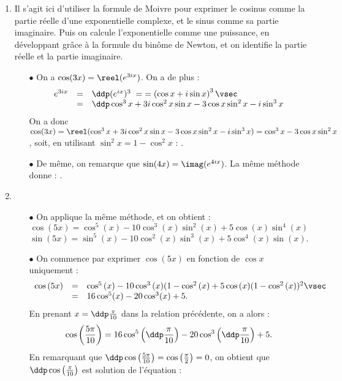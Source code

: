 \begin{correction}   \;
\begin{enumerate}
\item Il s'agit ici d'utiliser la formule de Moivre pour exprimer le cosinus comme la partie r\'eelle d'une exponentielle complexe, et le sinus comme sa partie imaginaire. Puis on calcule l'exponentielle comme une puissance, en d\'eveloppant gr\^ace \`a la formule du bin\^ome de Newton, et on identifie la partie r\'eelle et la partie imaginaire.
\begin{itemize}
\item[$\bullet$] On a $\cos (3x) = \reel(e^{3ix})$. On a de plus :
$$\begin{array}{rcl}
e^{3ix} & = & \ddp (e^{ix})^3 \; = \; = \left(\cos x + i \sin x \right)^3\vsec\\
& = & \ddp \cos^3 x + 3 i \cos^2 x \sin x - 3 \cos x \sin^2 x - i \sin^3 x
\end{array}$$
On a donc $\cos (3x) = \reel (\cos^3 x + 3 i \cos^2 x \sin x - 3 \cos x \sin^2 x - i \sin^3 x) = \cos^3{x}-3\cos{x}\sin^2{x}$, soit, en utilisant $\sin^2 x =1-\cos^2 x$ : . 
\item[$\bullet$] De m\^eme, on remarque que $\sin(4x) = \imag(e^{4ix})$. La m\^eme m\'ethode donne : .
\end{itemize}
\item 
\begin{itemize}
\item[$\bullet$]  On applique la m\^eme m\'ethode, et on obtient :
$$\cos{(5x)} = \cos^5{(x)}-10\cos^3{(x)}\sin^2{(x)}+5\cos{(x)}\sin^4{(x)}$$
$$\sin{(5x)}= \sin^5{(x)} -10\cos^2{(x)}\sin^3{(x)}+5\cos^4{(x)}\sin{(x)}  .$$
\item[$\bullet$] On commence par exprimer $\cos{(5x)}$ en fonction de $\cos x$ uniquement :
$$\begin{array}{rcl}
\cos{(5x)} & = & \cos^5{(x)}-10\cos^3{(x)}(1-\cos^2{(x)}+5\cos{(x)}(1-\cos^2{(x)})^2 \vsec\\
 & = & 16 \cos^5 (x) - 20 \cos^3(x) + 5. 
 \end{array}$$
En prenant $x=\ddp\frac{\pi}{10}$ dans la relation pr\'ec\'edente, on a alors :
$$\cos{\left(\frac{5\pi}{10}\right)} = 16 \cos^5{\left( \ddp\frac{\pi}{10}\right)}-20\cos^3{\left( \ddp\frac{\pi}{10}\right)}+5.$$
En remarquant que $\ddp \cos{\left(\frac{5\pi}{10}\right)} = \cos{\left(\frac{\pi}{2}\right)}=0$, on obtient que $\ddp \cos{\left(\frac{\pi}{10}\right)}$ est solution de l'\'equation :

\end{itemize}
\end{enumerate}
\end{correction}
